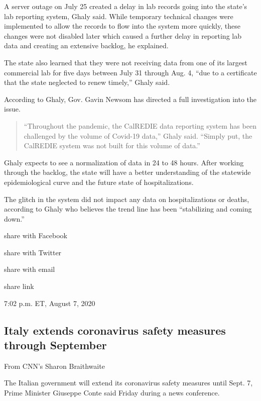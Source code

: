 A server outage on July 25 created a delay in lab records going into the
state's lab reporting system, Ghaly said. While temporary technical
changes were implemented to allow the records to flow into the system
more quickly, these changes were not disabled later which caused a
further delay in reporting lab data and creating an extensive backlog,
he explained.~

The state also learned that they were not receiving data from one of its
largest commercial lab for five days between July 31 through Aug. 4,
``due to a certificate that the state neglected to renew timely,'' Ghaly
said.

According to Ghaly, Gov. Gavin Newsom has directed a full investigation
into the issue.

\begin{quote}
``Throughout the pandemic, the CalREDIE data reporting system has been
challenged by the volume of Covid-19 data,'' Ghaly said. ``Simply put,
the CalREDIE system was not built for this volume of data.''
\end{quote}

Ghaly expects to see a normalization of data in 24 to 48 hours. After
working through the backlog, the state will have a better understanding
of the statewide epidemiological curve and the future state of
hospitalizations.

The glitch in the system did not impact any data on hospitalizations or
deaths, according to Ghaly who believes the trend line has been
``stabilizing and coming down.''

share with Facebook

share with Twitter

share with email

share link

7:02 p.m. ET, August 7, 2020

\hypertarget{italy-extends-coronavirus-safety-measures-through-september}{%
\subsection{Italy extends coronavirus safety measures through
September}\label{italy-extends-coronavirus-safety-measures-through-september}}

From CNN's Sharon Braithwaite

The Italian government will extend its coronavirus safety measures until
Sept. 7, Prime Minister Giuseppe Conte said Friday during a news
conference.

